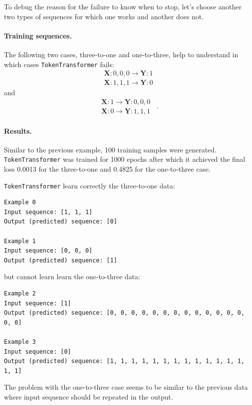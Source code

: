 \documentclass[final]{article}
\begin{document}
To debug the reason for the failure to know when to stop, let's choose
another two types of sequences for which one works and another does not.


\paragraph{Training sequences.}
The following two cases, three-to-one and one-to-three,
help to understand in which cases \texttt{TokenTransformer} fails:
\begin{displaymath}
  \begin{split}
    \mathbf{X}: 0,0,0 \rightarrow \mathbf{Y}: 1\\
    \mathbf{X}: 1,1,1 \rightarrow \mathbf{Y}: 0
  \end{split}
\end{displaymath}
and
\begin{displaymath}
  \begin{split}
    \mathbf{X}: 1 \rightarrow \mathbf{Y}: 0, 0, 0\\
    \mathbf{X}: 0 \rightarrow \mathbf{Y}: 1, 1, 1
  \end{split} \enspace .
\end{displaymath}

\paragraph{Results.}
Similar to the previous example, 100 training samples were generated.
\texttt{TokenTransformer} was trained for 1000 epochs after which it achieved the final loss 0.0013 for the three-to-one and 0.4825 for the one-to-three case.

\texttt{TokenTransformer} learn correctly the three-to-one data:
\begin{verbatim}
Example 0
Input sequence: [1, 1, 1]
Output (predicted) sequence: [0]

Example 1
Input sequence: [0, 0, 0]
Output (predicted) sequence: [1]
\end{verbatim}
but cannot learn learn the one-to-three data:
\begin{verbatim}
Example 2
Input sequence: [1]
Output (predicted) sequence: [0, 0, 0, 0, 0, 0, 0, 0, 0, 0, 0, 0, 0, 0, 0]

Example 3
Input sequence: [0]
Output (predicted) sequence: [1, 1, 1, 1, 1, 1, 1, 1, 1, 1, 1, 1, 1, 1, 1]
\end{verbatim}

The problem with the one-to-three case seems to be similar to the previous data where input sequence should be repeated in the output.
\end{document}
